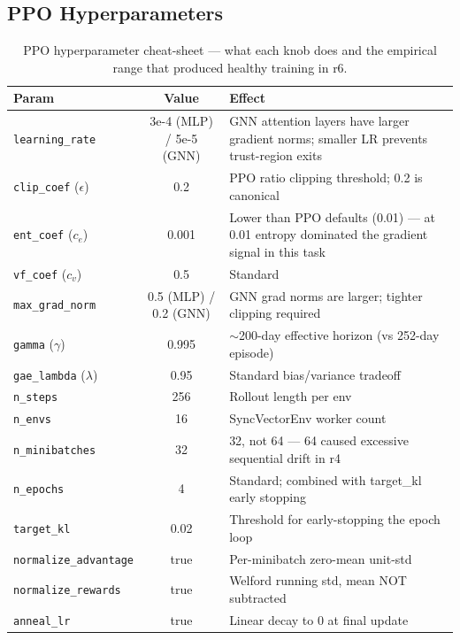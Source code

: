 \documentclass[11pt,a4paper]{article}
\begin{document}
\subsection{PPO Hyperparameters}

\begin{table}[h]
\centering
\small
\caption{PPO hyperparameter cheat-sheet --- what each knob does and the empirical
range that produced healthy training in r6.}
\begin{tabularx}{\textwidth}{l c X}
\toprule
\textbf{Param} & \textbf{Value} & \textbf{Effect} \\
\midrule
\texttt{learning\_rate} & 3e-4 (MLP) / 5e-5 (GNN) & GNN attention layers have larger gradient norms; smaller LR prevents trust-region exits \\
\texttt{clip\_coef} ($\epsilon$) & 0.2 & PPO ratio clipping threshold; 0.2 is canonical \\
\texttt{ent\_coef} ($c_e$) & 0.001 & Lower than PPO defaults (0.01) --- at 0.01 entropy dominated the gradient signal in this task \\
\texttt{vf\_coef} ($c_v$) & 0.5 & Standard \\
\texttt{max\_grad\_norm} & 0.5 (MLP) / 0.2 (GNN) & GNN grad norms are larger; tighter clipping required \\
\texttt{gamma} ($\gamma$) & 0.995 & $\sim$200-day effective horizon (vs 252-day episode) \\
\texttt{gae\_lambda} ($\lambda$) & 0.95 & Standard bias/variance tradeoff \\
\texttt{n\_steps} & 256 & Rollout length per env \\
\texttt{n\_envs} & 16 & SyncVectorEnv worker count \\
\texttt{n\_minibatches} & 32 & 32, not 64 --- 64 caused excessive sequential drift in r4 \\
\texttt{n\_epochs} & 4 & Standard; combined with target\_kl early stopping \\
\texttt{target\_kl} & 0.02 & Threshold for early-stopping the epoch loop \\
\texttt{normalize\_advantage} & true & Per-minibatch zero-mean unit-std \\
\texttt{normalize\_rewards} & true & Welford running std, mean NOT subtracted \\
\texttt{anneal\_lr} & true & Linear decay to 0 at final update \\
\bottomrule
\end{tabularx}
\end{table}
\end{document}
